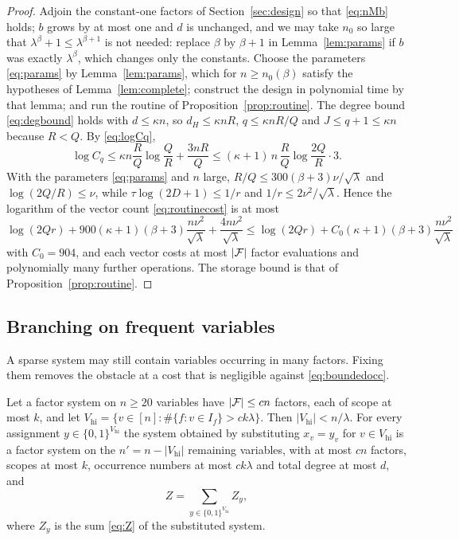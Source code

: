 \begin{proof}
Adjoin the constant-one factors of Section~\ref{sec:design} so that
\eqref{eq:nMb} holds; $b$ grows by at most one and $d$ is unchanged, and we may
take $n_0$ so large that $\lambda^\beta+1\le\lambda^{\beta+1}$ is not needed:
replace $\beta$ by $\beta+1$ in Lemma~\ref{lem:params} if $b$ was exactly
$\lambda^\beta$, which changes only the constants. Choose the parameters
\eqref{eq:params} by Lemma~\ref{lem:params}, which for $n\ge n_0(\beta)$
satisfy the hypotheses of Lemma~\ref{lem:complete}; construct the design in
polynomial time by that lemma; and run the routine of
Proposition~\ref{prop:routine}. The degree bound \eqref{eq:degbound} holds with
$d\le\kappa n$, so $d_H\le\kappa nR$, $q\le\kappa nR/Q$ and $J\le q+1\le\kappa n$
because $R<Q$. By \eqref{eq:logCq},
\[
  \log C_q\le\kappa n\frac RQ\log\frac QR+\frac{3nR}{Q}
  \le(\kappa+1)\,n\,\frac{R}{Q}\log\frac{2Q}{R}\cdot 3 .
\]
With the parameters \eqref{eq:params} and $n$ large, $R/Q\le 300(\beta+3)\nu/\sqrt\lambda$
and $\log(2Q/R)\le\nu$, while $\tau\log(2D+1)\le 1/r$ and
$1/r\le 2\nu^2/\sqrt\lambda$. Hence the logarithm of the vector count
\eqref{eq:routinecost} is at most
\[
  \log(2Qr)+900(\kappa+1)(\beta+3)\frac{n\nu^2}{\sqrt\lambda}+\frac{4n\nu^2}{\sqrt\lambda}
  \le \log(2Qr)+C_0(\kappa+1)(\beta+3)\frac{n\nu^2}{\sqrt\lambda}
\]
with $C_0=904$, and each vector costs at most $|\mathcal{F}|$ factor evaluations and
polynomially many further operations. The storage bound is that of
Proposition~\ref{prop:routine}.
\end{proof}

\subsection{Branching on frequent variables}
A sparse system may still contain variables occurring in many factors. Fixing
them removes the obstacle at a cost that is negligible against
\eqref{eq:boundedocc}.

\begin{lemma}\label{lem:frequent}
Let a factor system on $n\ge 20$ variables have $|\mathcal{F}|\le cn$ factors, each of
scope at most $k$, and let $V_{\mathrm{hi}}=\{v\in[n]:\#\{f:v\in I_f\}>ck\lambda\}$.
Then $|V_{\mathrm{hi}}|<n/\lambda$. For every assignment
$y\in\{0,1\}^{V_{\mathrm{hi}}}$ the system obtained by substituting $x_v=y_v$ for
$v\in V_{\mathrm{hi}}$ is a factor system on the $n'=n-|V_{\mathrm{hi}}|$
remaining variables, with at most $cn$ factors, scopes at most $k$, occurrence
numbers at most $ck\lambda$ and total degree at most $d$, and
\begin{equation}\label{eq:branchsum}
  Z=\sum_{y\in\{0,1\}^{V_{\mathrm{hi}}}}Z_y ,
\end{equation}
where $Z_y$ is the sum \eqref{eq:Z} of the substituted system.
\end{lemma}

